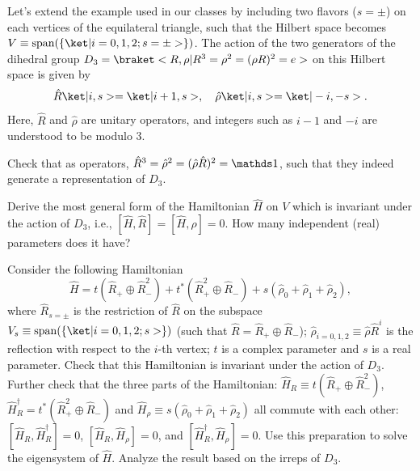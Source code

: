 \begin{problem}[Representation of $D_3$]
  Let's extend the example used in our classes by including two
  flavors ($s = \pm$) on each vertices of the equilateral triangle, such that
  the Hilbert space becomes $V \equiv \operatorname{span}
    (\{\ket|i = 0,1,2; s = \pm>\})$. The action of the two generators of the
  dihedral group $D_3 = \braket<R,\rho|R^3 = \rho^2 = (\rho R)^2 = e>$ on this
  Hilbert space is given by
  \[
    \hat R\ket|i, s> = \ket|i + 1, s>, \quad
    \hat \rho \ket|i, s> = \ket|-i, -s>.
  \]
  Here, $\hat R$ and $\hat \rho$ are unitary operators, and integers such as
  $i - 1$ and $-i$ are understood to be modulo $3$.
  \begin{enumext}
    \item Check that as operators, $\hat R^3 = \hat\rho^2
    = (\hat \rho\hat R)^2 = \identity$, such that they indeed generate a
    representation of $D_3$.
    \item Derive the most general form of the Hamiltonian $\hat H$ on $V$ which
    is invariant under the action of $D_3$, i.e., $[\hat H, \hat R]
    = [\hat H, \rho] = 0$. How many independent (real) parameters does it have?
    \item Consider the following Hamiltonian
    \[
      \hat H = t(\hat R_+ \oplus \hat R_-^2)
             + t^*(\hat R_+^2 \oplus \hat R_-)
             + s(\hat \rho_0 + \hat \rho_1 + \hat \rho_2),
    \]
    where $\hat R_{s=\pm}$ is the restriction of $\hat R$ on the
    subspace $V_s \equiv \operatorname{span}(\{\ket|i = 0,1,2;s>\})$
    (such that $\hat R = \hat R_+ \oplus \hat R_-$);
    $\hat \rho_{i=0,1,2} \equiv \hat\rho \hat R^i$ is the reflection with
    respect to the $i$-th vertex; $t$ is a complex parameter and $s$ is a real
    parameter. Check that this Hamiltonian is invariant under the action
    of $D_3$. Further check that the three parts of the Hamiltonian: $\hat H_R
    \equiv t(\hat R_+ \oplus \hat R_-^2)$, $\hat H_R^\dagger
    = t^*(\hat R_+^2 \oplus \hat R_-)$
    and $\hat H_\rho \equiv s(\hat \rho_0 + \hat \rho_1 + \hat \rho_2)$ all
    commute with each other: $[\hat H_R, \hat H_R^\dagger] = 0$,
    $[\hat H_R, \hat H_\rho] = 0$, and $[\hat H_R^\dagger, \hat H_\rho] = 0$.
    Use this preparation to solve the eigensystem of $\hat H$. Analyze the
    result based on the irreps of $D_3$.
  \end{enumext}
\end{problem}
